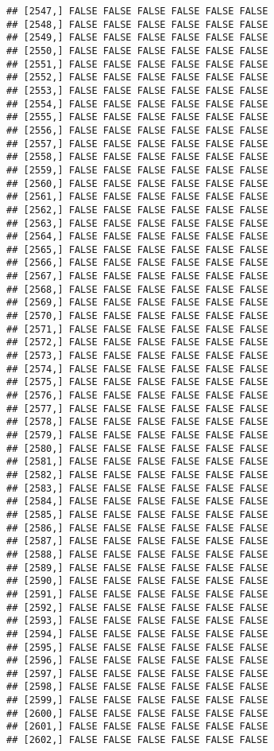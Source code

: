 \documentclass[
]{article}
\begin{document}
\begin{verbatim}
## [2547,] FALSE FALSE FALSE FALSE FALSE FALSE
## [2548,] FALSE FALSE FALSE FALSE FALSE FALSE
## [2549,] FALSE FALSE FALSE FALSE FALSE FALSE
## [2550,] FALSE FALSE FALSE FALSE FALSE FALSE
## [2551,] FALSE FALSE FALSE FALSE FALSE FALSE
## [2552,] FALSE FALSE FALSE FALSE FALSE FALSE
## [2553,] FALSE FALSE FALSE FALSE FALSE FALSE
## [2554,] FALSE FALSE FALSE FALSE FALSE FALSE
## [2555,] FALSE FALSE FALSE FALSE FALSE FALSE
## [2556,] FALSE FALSE FALSE FALSE FALSE FALSE
## [2557,] FALSE FALSE FALSE FALSE FALSE FALSE
## [2558,] FALSE FALSE FALSE FALSE FALSE FALSE
## [2559,] FALSE FALSE FALSE FALSE FALSE FALSE
## [2560,] FALSE FALSE FALSE FALSE FALSE FALSE
## [2561,] FALSE FALSE FALSE FALSE FALSE FALSE
## [2562,] FALSE FALSE FALSE FALSE FALSE FALSE
## [2563,] FALSE FALSE FALSE FALSE FALSE FALSE
## [2564,] FALSE FALSE FALSE FALSE FALSE FALSE
## [2565,] FALSE FALSE FALSE FALSE FALSE FALSE
## [2566,] FALSE FALSE FALSE FALSE FALSE FALSE
## [2567,] FALSE FALSE FALSE FALSE FALSE FALSE
## [2568,] FALSE FALSE FALSE FALSE FALSE FALSE
## [2569,] FALSE FALSE FALSE FALSE FALSE FALSE
## [2570,] FALSE FALSE FALSE FALSE FALSE FALSE
## [2571,] FALSE FALSE FALSE FALSE FALSE FALSE
## [2572,] FALSE FALSE FALSE FALSE FALSE FALSE
## [2573,] FALSE FALSE FALSE FALSE FALSE FALSE
## [2574,] FALSE FALSE FALSE FALSE FALSE FALSE
## [2575,] FALSE FALSE FALSE FALSE FALSE FALSE
## [2576,] FALSE FALSE FALSE FALSE FALSE FALSE
## [2577,] FALSE FALSE FALSE FALSE FALSE FALSE
## [2578,] FALSE FALSE FALSE FALSE FALSE FALSE
## [2579,] FALSE FALSE FALSE FALSE FALSE FALSE
## [2580,] FALSE FALSE FALSE FALSE FALSE FALSE
## [2581,] FALSE FALSE FALSE FALSE FALSE FALSE
## [2582,] FALSE FALSE FALSE FALSE FALSE FALSE
## [2583,] FALSE FALSE FALSE FALSE FALSE FALSE
## [2584,] FALSE FALSE FALSE FALSE FALSE FALSE
## [2585,] FALSE FALSE FALSE FALSE FALSE FALSE
## [2586,] FALSE FALSE FALSE FALSE FALSE FALSE
## [2587,] FALSE FALSE FALSE FALSE FALSE FALSE
## [2588,] FALSE FALSE FALSE FALSE FALSE FALSE
## [2589,] FALSE FALSE FALSE FALSE FALSE FALSE
## [2590,] FALSE FALSE FALSE FALSE FALSE FALSE
## [2591,] FALSE FALSE FALSE FALSE FALSE FALSE
## [2592,] FALSE FALSE FALSE FALSE FALSE FALSE
## [2593,] FALSE FALSE FALSE FALSE FALSE FALSE
## [2594,] FALSE FALSE FALSE FALSE FALSE FALSE
## [2595,] FALSE FALSE FALSE FALSE FALSE FALSE
## [2596,] FALSE FALSE FALSE FALSE FALSE FALSE
## [2597,] FALSE FALSE FALSE FALSE FALSE FALSE
## [2598,] FALSE FALSE FALSE FALSE FALSE FALSE
## [2599,] FALSE FALSE FALSE FALSE FALSE FALSE
## [2600,] FALSE FALSE FALSE FALSE FALSE FALSE
## [2601,] FALSE FALSE FALSE FALSE FALSE FALSE
## [2602,] FALSE FALSE FALSE FALSE FALSE FALSE

\end{verbatim}
\end{document}
